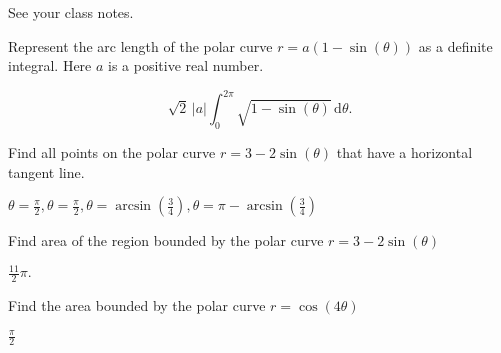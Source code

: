\documentclass[12pt,fleqn]{exam}
\begin{document}
\begin{questions}
\begin{solution}%
  See your class notes.
\end{solution}

\newpage 
\question Represent the arc length of the polar curve $r = a (1-\sin(\theta))$
as a definite integral. Here $a$ is a positive real number.

\begin{solution}[3.5in]
  $$
  \sqrt{2}\, \left| a\right|  \int_0^{2 \pi}   \sqrt{1-\sin{(\theta)}}
  \, \mathrm{d} \theta.
  $$
\end{solution}

\question Find all points on the polar curve $r = 3 - 2 \sin(\theta)$
that have a horizontal tangent line.

\begin{solution}%
 $\theta= \frac{\pi}{2}, \theta= \frac{\pi}{2},
  \theta = \operatorname{arcsin}\left( \frac{3}{4}\right) ,
  \theta = \pi - \operatorname{arcsin}\left( \frac{3}{4}\right)$
\end{solution}

\newpage 
\question Find area of the region bounded by the  polar curve 
$r = 3 - 2 \sin(\theta)$

\begin{solution}[3.5in]
 $\frac{11}{2} \pi.$
\end{solution}

\question Find the area bounded by the polar curve $r = \cos(4 \theta)$
\begin{solution}[3.5in]
  $\frac{\pi}{2}$
\end{solution}




\end{questions}

    
\end{document}
